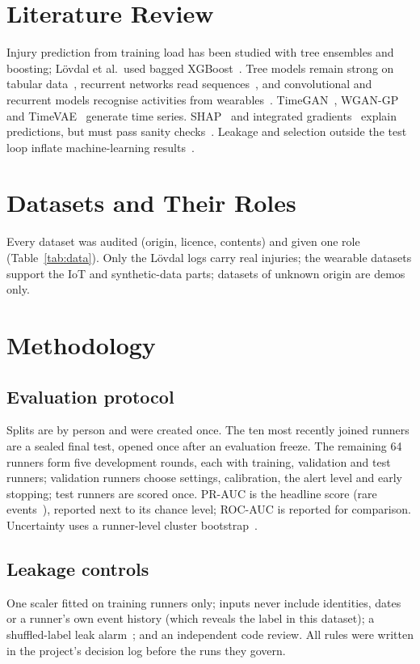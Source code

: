 \documentclass[11pt,a4paper]{report}
\begin{document}
\chapter{Literature Review}
Injury prediction from training load has been studied with tree ensembles and boosting;
L\"ovdal et al.\ used bagged XGBoost~\cite{lovdal2021,chen2016}. Tree models remain strong on
tabular data~\cite{grinsztajn2022,breiman2001,prokhorenkova2018}, recurrent networks read
sequences~\cite{cho2014}, and convolutional and recurrent models recognise activities from
wearables~\cite{hammerla2016}. TimeGAN~\cite{yoon2019}, WGAN-GP~\cite{gulrajani2017} and
TimeVAE~\cite{desai2021} generate time series. SHAP~\cite{lundberg2017} and integrated
gradients~\cite{sundararajan2017} explain predictions, but must pass sanity
checks~\cite{adebayo2018}. Leakage and selection outside the test loop inflate machine-learning
results~\cite{kapoor2023,varma2006,cawley2010}.

\chapter{Datasets and Their Roles}
Every dataset was audited (origin, licence, contents) and given one role
(Table~\ref{tab:data}). Only the L\"ovdal logs carry real injuries; the wearable datasets
support the IoT and synthetic-data parts; datasets of unknown origin are demos only.


\chapter{Methodology}
\section{Evaluation protocol}
Splits are by person and were created once. The ten most recently joined runners are a sealed
final test, opened once after an evaluation freeze. The remaining 64 runners form five
development rounds, each with training, validation and test runners; validation runners choose
settings, calibration, the alert level and early stopping; test runners are scored once.
PR-AUC is the headline score (rare events~\cite{saito2015}), reported next to its chance level;
ROC-AUC is reported for comparison. Uncertainty uses a runner-level cluster
bootstrap~\cite{field2007}.
\section{Leakage controls}
One scaler fitted on training runners only; inputs never include identities, dates or a
runner's own event history (which reveals the label in this dataset); a shuffled-label leak
alarm~\cite{ojala2010}; and an independent code review. All rules were written in the project's
decision log before the runs they govern.
\end{document}
